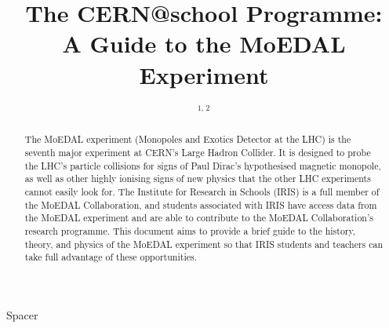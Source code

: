 \documentclass[12pt,a4paper]{iopart}
\begin{document}
%
%


\title{%
  The CERN@school Programme: \\
  A Guide to the MoEDAL Experiment
}
% 
\author{\theauthorinit$^{1, \, 2}$}
%
\address{$^1$\theauthoraddressA}
\address{$^2$\theauthoraddressB}
\ead{\mailto{\theauthoremail}}

\begin{abstract}
The MoEDAL experiment (Monopoles and Exotics Detector at the LHC)
is the seventh major experiment at CERN's Large Hadron Collider.
%
It is designed to probe the LHC's particle collisions
for signs of Paul Dirac's hypothesised magnetic monopole,
as well as other highly ionising signs of new physics that
the other LHC experiments cannot easily look for.
%
The Institute for Research in Schools (IRIS) is a full member of 
the MoEDAL Collaboration, and students associated with IRIS
have access data from the MoEDAL experiment and are able to contribute
to the MoEDAL Collaboration's research programme.
%
This document aims to provide a brief guide to the history, theory,
and physics of the MoEDAL experiment so that IRIS students and teachers
can take full advantage of these opportunities.
\end{abstract}

{\color{white}Spacer}
\\[4cm]



\newpage

\setcounter{tocdepth}{2}
\tableofcontents

\clearpage

\listoffigures

\listoftables

\clearpage

%
%


\clearpage



\clearpage



\clearpage
\end{document}
